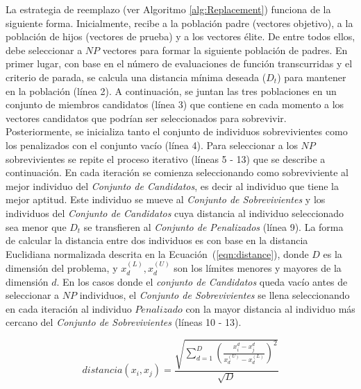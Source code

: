 La estrategia de reemplazo (ver Algoritmo \ref{alg:Replacement}) funciona de la siguiente forma.
%
Inicialmente, recibe a la población padre (vectores objetivo), a la población de hijos (vectores de prueba) y a los vectores élite.
%
De entre todos ellos, debe seleccionar a $NP$ vectores para formar la siguiente población de padres.
%
En primer lugar, con base en el número de evaluaciones de función transcurridas y el criterio de parada, se calcula una distancia mínima deseada ($D_t$) para mantener 
en la población (línea 2).
%
A continuación, se juntan las tres poblaciones en un conjunto de miembros candidatos (línea 3) que contiene en cada momento a los vectores candidatos 
que podrían ser seleccionados para sobrevivir.
%
Posteriormente, se inicializa tanto el conjunto de individuos sobrevivientes como los penalizados con el conjunto vacío (línea 4).
%
Para seleccionar a los $NP$ sobrevivientes se repite el proceso iterativo (líneas 5 - 13) que se describe a continuación.
%
En cada iteración se comienza seleccionando como sobreviviente al mejor individuo del \textit{Conjunto de Candidatos}, es decir al individuo que tiene la mejor aptitud.
%
Este individuo se mueve al \textit{Conjunto de Sobrevivientes} y los individuos del \textit{Conjunto de Candidatos} cuya distancia al individuo seleccionado sea menor 
que $D_t$ se transfieren al \textit{Conjunto de Penalizados} (línea 9).
%
La forma de calcular la distancia entre dos individuos es con base en la distancia Euclidiana normalizada descrita en la Ecuación~(\ref{eqn:distance}), 
donde $D$ es la dimensión del problema, y $x_d^{(L)}, x_d^{(U)}$ son los límites menores y mayores de la dimensión $d$.
%
En los casos donde el \textit{conjunto de Candidatos} queda vacío antes de seleccionar a $NP$ individuos, 
el \textit{Conjunto de Sobrevivientes} se llena seleccionando en cada iteración al individuo $Penalizado$ con la mayor distancia al individuo más cercano 
del \textit{Conjunto de Sobrevivientes} (líneas 10 - 13).

\begin{equation}\label{eqn:distance}
distancia ( x_{i}, x_j ) = \frac{\sqrt{ \sum_{d=1}^D \left ( \frac{x_{i}^d - x_j^d}{x_d^{(U)} - x_d^{(L)}} \right )^2  }} {\sqrt{D}}
\end{equation}


